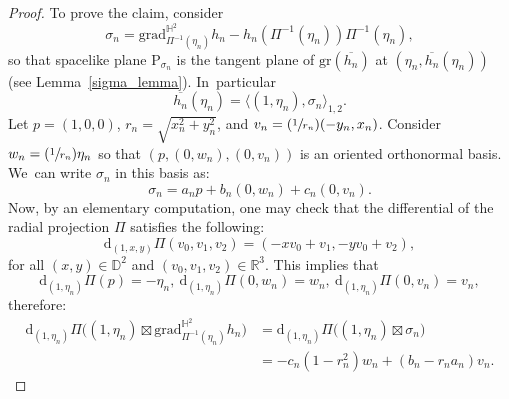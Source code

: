 \documentclass[JEP,XML,SOM,Unicode,NoEqCountersInSection, NoFloatCountersInSection,published]{cedram}
\newcommand{\Psfrac}[2]{(\sfrac{#1}{#2})}
\theoremstyle{plain}
\theoremstyle{definition}
\newcommand{\grad}{\mathrm{grad}^{\mathbb{H}^2}}
\newcommand{\inner}[1] {\langle #1 \rangle}
\begin{document}
\begin{proof}
To prove the claim, consider
\[
\sigma_n=\grad_{\Pi^{-1}(\eta_n)}h_n-h_n(\Pi^{-1}(\eta_n))\Pi^{-1}(\eta_n),
\]
so that spacelike plane $\mathrm{P}_{\sigma_n}$ is the tangent plane of $\mathrm{gr}(\overline{h_n})$ at $(\eta_n,\overline{h_n}(\eta_n))$ (see Lem\-ma~\ref{sigma_lemma}). In~particular
\begin{equation}\label{u(pi2)}
\overline{h_n}(\eta_n)= \inner{(1,\eta_n),\sigma_n}_{1,2}.
\end{equation}
Let $p = (1, 0, 0)$, $r_n = \sqrt{x_n^2 + y_n^2}$, and $v_n = \Psfrac{1}{r_n}(-y_n, x_n)$. Consider $w_n = \Psfrac{1}{r_n}\eta_n$ so that $(p, (0,w_n), (0,v_n))$ is an oriented orthonormal basis. We~can write $\sigma_n$ in this basis as: \begin{equation}\label{sigma_n}
\sigma_n=a_np+b_n(0,w_n)+c_n(0,v_n).
\end{equation}
Now, by an elementary computation, one may check that the differential of the radial projection $\Pi$ satisfies the following:
\[
\mathrm{d}_{(1,x,y)}\Pi(v_0,v_1,v_2)=(-x v_0+v_1, -y v_0+v_2),
\]
for all $(x,y)\in\mathbb{D}^2$ and $(v_0,v_1,v_2)\in\mathbb{R}^3$. This implies that
\[
\mathrm{d}_{(1,\eta_n)}\Pi(p) = -\eta_n,\ \mathrm{d}_{(1,\eta_n)}\Pi(0,w_n) = w_n, \ \mathrm{d}_{(1,\eta_n)}\Pi(0,v_n) = v_n,
\]
therefore:
\begin{equation}\label{pullback_of_vector_field2}
\begin{aligned}
\mathrm{d}_{(1,\eta_n)}\Pi\!\bigl((1,\eta_n)\boxtimes
\grad_{\Pi^{-1}(\eta_n)} h_n\bigr)
&= \mathrm{d}_{(1,\eta_n)}\Pi\!\bigl((1,\eta_n)\boxtimes\sigma_n\bigr) \\
&= -c_n(1-r_n^2)w_n + (b_n-r_na_n)v_n.
\end{aligned}
\end{equation}


\end{proof}
\end{document}
